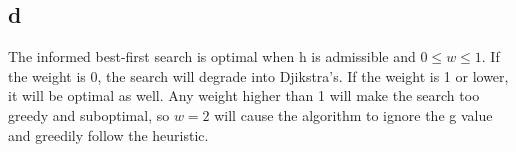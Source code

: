 \documentclass[11pt, oneside]{article}   	%
\begin{document}
\begin{flushleft}
\subsection*{d}
The informed best-first search is optimal when h is admissible and $0 \leq w \leq 1$. If the weight is 0, the search will degrade into Djikstra's. If the weight is 1 or lower, it will be optimal as well. Any weight higher than 1 will make the search too greedy and suboptimal, so $w=2$ will cause the algorithm to ignore the g value and greedily follow the heuristic.\\\medskip

\end{flushleft}
\end{document}

